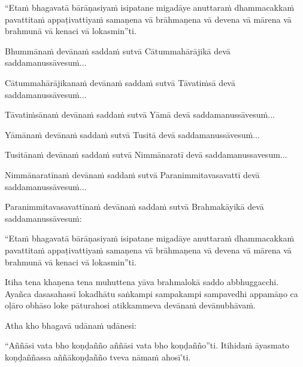 \begin{pali-hang}
  ``Etaṁ bhagavatā bārāṇasiyaṁ isipatane migadāye anuttaraṁ dhammacakkaṁ pavattitaṁ appaṭivattiyaṁ samaṇena vā brāhmaṇena vā devena vā mārena vā brahmunā vā kenaci vā lokasmin''ti.
\end{pali-hang}

\begin{pali-hang}
  Bhummānaṁ devānaṁ saddaṁ sutvā Cātummahārājikā devā saddamanussāvesuṁ...
\end{pali-hang}

\begin{pali-hang}
  Cātummahārājikanaṁ devānaṁ saddaṁ sutvā Tāvatiṁsā devā saddamanussāvesuṁ...
\end{pali-hang}

\begin{pali-hang}
  Tāvatiṁsānaṁ devānaṁ saddaṁ sutvā Yāmā devā saddamanussāvesuṁ...
\end{pali-hang}

\begin{pali-hang}
  Yāmānaṁ devānaṁ saddaṁ sutvā Tusitā devā saddamanussāvesuṁ...
\end{pali-hang}

\begin{pali-hang}
  Tusitānaṁ devānaṁ saddaṁ sutvā Nimmānaratī devā saddamanussavesum...
\end{pali-hang}

\begin{pali-hang}
  Nimmānaratīnaṁ devānaṁ saddaṁ sutvā Paranimmitavasavattī devā saddamanussāvesuṁ...
\end{pali-hang}

\begin{pali-hang}
  Paranimmitavasavattīnaṁ devānaṁ saddaṁ sutvā Brahmakāyikā devā saddamanussāvesuṁ:
\end{pali-hang}

\begin{pali-hang}
  ``Etaṁ bhagavatā bārāṇasiyaṁ isipatane migadāye anuttaraṁ dhammacakkaṁ pavattitaṁ appaṭivattiyaṁ samaṇena vā brāhmaṇena vā devena vā mārena vā brahmunā vā kenaci vā lokasmin''ti.
\end{pali-hang}

\begin{pali-hang}
  Itiha tena khaṇena tena muhuttena yāva brahmalokā saddo abbhuggacchi. Ayañca dasasahassī lokadhātu saṅkampi sampakampi sampavedhi appamāṇo ca oḷāro obhāso loke pāturahosi atikkammeva devānaṁ devānubhāvaṁ.
\end{pali-hang}

Atha kho bhagavā udānaṁ udānesi:

\begin{pali-hang}
  ``Aññāsi vata bho koṇḍañño aññāsi vata bho koṇḍañño''ti. Itihidaṁ āyasmato koṇḍaññassa aññākoṇḍañño tveva nāmaṁ ahosī'ti.
\end{pali-hang}

\suttaRef{[SN 56.11]}
